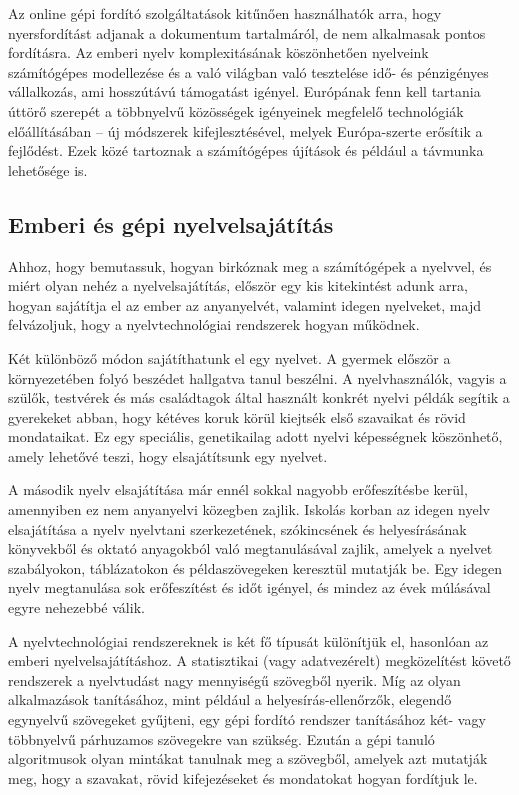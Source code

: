 \begin{multicols}{2}

  Az online gépi fordító szolgáltatások kitűnően használhatók arra, hogy nyersfordítást adjanak a dokumentum tartalmáról, de nem alkalmasak pontos fordításra. Az emberi nyelv komplexitásának köszönhetően nyelveink számítógépes modellezése és a való világban való tesz\-te\-lé\-se idő- és pénzigényes vállalkozás, ami hosszú\-tá\-vú támogatást igényel. Európának fenn kell tartania úttörő sze\-re\-pét a többnyelvű közösségek igényeinek megfelelő technológiák előállításában -- új módszerek kifejlesztésével, melyek Európa-szerte erősítik a fejlődést. Ezek közé tartoznak a számítógépes újítások és például a távmunka lehetősége is.

  \subsection{Emberi és gépi nyelvelsajátítás}

  Ahhoz, hogy bemutassuk, hogyan birkóznak meg a számítógépek a nyelvvel, és miért olyan nehéz a nyelvelsajátítás, elő\-ször egy kis kitekintést adunk arra, hogyan sajátítja el az ember az anyanyelvét, valamint idegen nyelveket, majd felvázoljuk, hogy a nyelvtechnológiai rend\-sze\-rek hogyan működnek. 


  Két különböző módon sajátíthatunk el egy nyelvet. A gyermek először a kör\-nye\-ze\-té\-ben folyó beszédet hallgatva tanul beszélni. A nyelvhasználók, vagyis a szülők, testvérek és más családtagok által használt konkrét nyelvi példák segítik a gyerekeket abban, hogy kétéves koruk körül kiejtsék első szavaikat és rövid mondataikat. Ez egy speciális, genetikailag adott nyelvi képességnek köszönhető, a\-mely lehetővé teszi, hogy elsajátítsunk egy nyelvet. 

  A második nyelv elsajátítása már ennél sokkal nagyobb erőfeszítésbe kerül, a\-mennyi\-ben ez nem anyanyelvi közegben zajlik. Iskolás korban az idegen nyelv elsajátítása a nyelv nyelvtani szerkezetének, szókincsének és helyesírásának könyvekből és oktató anyagokból való megtanulásával zajlik, amelyek a nyelvet szabályokon, táblázatokon és példaszövegeken keresztül mutatják be. Egy idegen nyelv meg\-ta\-nu\-lá\-sa sok erőfeszítést és időt igényel, és mindez  az évek múlásával egyre nehezebbé válik.  

  A nyelvtechnológiai rendszereknek is két fő típusát különítjük el, hasonlóan az emberi nyelvelsajátításhoz. A statisztikai (vagy adatvezérelt) megközelítést követő rendszerek a nyelvtudást nagy mennyi\-sé\-gű  szövegből nyerik. Míg az olyan alkalmazások tanításához, mint például a helyesírás-ellenőrzők, elegendő egynyelvű szövegeket gyűjteni, egy gépi fordító rendszer tanításához két- vagy többnyelvű párhuzamos szövegekre van szükség. Ez\-után a gépi tanuló algoritmusok olyan mintákat tanulnak meg a szövegből, amelyek azt mutatják meg, hogy a szavakat, rövid kifejezéseket és mondatokat hogyan fordítjuk le.  


\end{multicols}
